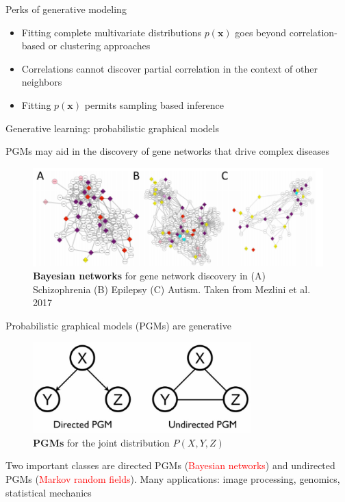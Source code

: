 \documentclass{beamer}					%
\begin{document}
\begin{frame}{Perks of generative modeling}

\begin{itemize}
\item Fitting complete multivariate distributions $p(\mathbf{x})$ goes beyond correlation-based or clustering approaches
\item Correlations cannot discover partial correlation in the context of other neighbors
\item Fitting $p(\mathbf{x})$ permits sampling based inference
\end{itemize}

\end{frame}

\begin{frame}{Generative learning: probabilistic graphical models}

PGMs may aid in the discovery of gene networks that drive complex diseases  

\begin{center}
\begin{figure}
\includegraphics[width=1.0\textwidth]{gene-net}
\caption{\textbf{Bayesian networks} for gene network discovery in (A) Schizophrenia (B) Epilepsy (C) Autism. Taken from Mezlini et al. 2017}
\end{figure}
\end{center}

\end{frame}

\begin{frame}{Probabilistic graphical models (PGMs) are generative}

\begin{center}
\begin{figure}
\includegraphics[width=0.75\textwidth]{pgm}
\caption{\textbf{PGMs} for the joint distribution $P(X,Y,Z)$}
\end{figure}
\end{center}

Two important classes are directed PGMs (\textcolor{red}{Bayesian networks}) and undirected PGMs (\textcolor{red}{Markov random fields}). Many applications: image processing, genomics, statistical mechanics

\end{frame}
\end{document}

